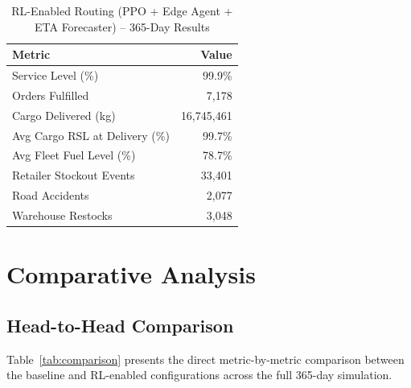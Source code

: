 \begin{table}[h!]
\centering
\caption{RL-Enabled Routing (PPO + Edge Agent + ETA Forecaster) -- 365-Day Results}
\label{tab:rl_results}
\begin{tabular}{|l|r|}
\hline
\textbf{Metric}                     & \textbf{Value} \\
\hline
Service Level (\%)                  & 99.9\%         \\
\hline
Orders Fulfilled                    & 7,178          \\
\hline
Cargo Delivered (kg)                & 16,745,461     \\
\hline
Avg Cargo RSL at Delivery (\%)      & 99.7\%         \\
\hline
Avg Fleet Fuel Level (\%)           & 78.7\%         \\
\hline
Retailer Stockout Events            & 33,401         \\
\hline
Road Accidents                      & 2,077          \\
\hline
Warehouse Restocks                  & 3,048          \\
\hline
\end{tabular}
\end{table}

\section{Comparative Analysis}

\subsection{Head-to-Head Comparison}

Table~\ref{tab:comparison} presents the direct metric-by-metric comparison between
the baseline and RL-enabled configurations across the full 365-day simulation.

